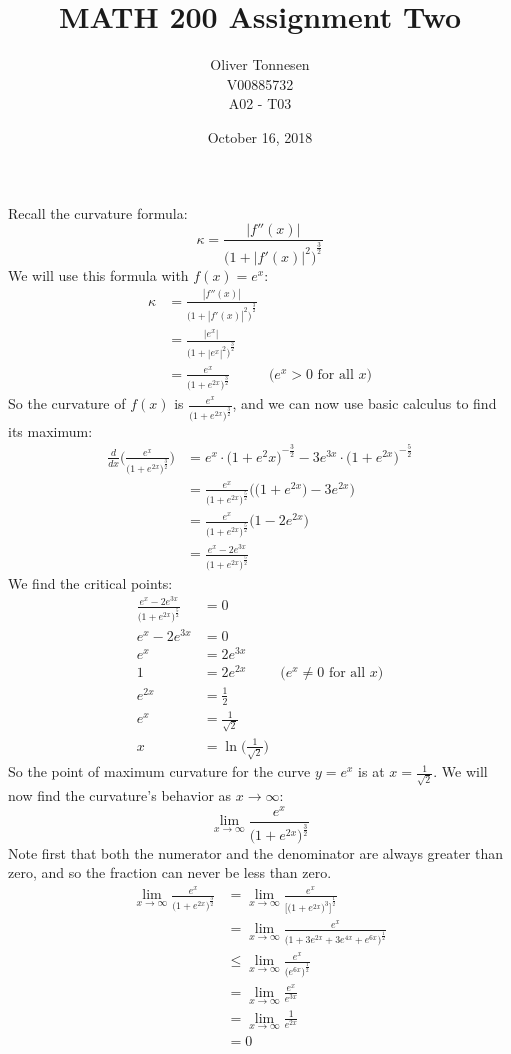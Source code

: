 \documentclass{article}
\title{MATH 200 Assignment Two}
\author{%
	Oliver Tonnesen\\
	V00885732\\
	A02 \-- T03}
\date{October 16, 2018}
\begin{document}
\maketitle
\section{} %
	Recall the curvature formula:
	\[\kappa=\frac{|f''(x)|}{{\big(1+|f'(x)|^2\big)}^{\frac{3}{2}}}\]
	We will use this formula with $f(x)=e^x$:
	\begin{align*}
		\kappa&=\frac{|f''(x)|}{{\big(1+|f'(x)|^2\big)}^{\frac{3}{2}}}\\
		&=\frac{|e^x|}{{\big(1+|e^x|^2\big)}^\frac{3}{2}}\\
		&=\frac{e^x}{{\big(1+e^{2x}\big)}^\frac{3}{2}}&\text{($e^x>0$ for all $x$)}
	\end{align*}
	So the curvature of $f(x)$ is $\frac{e^x}{{\big(1+e^{2x}\big)}^\frac{3}{2}}$, and we can now use basic calculus to find
	its maximum:
	\begin{align*}
		\frac{d}{dx}\Bigg(\frac{e^x}{{\big(1+e^{2x}\big)}^\frac{3}{2}}\Bigg)&=e^x\cdot{\big(1+e^2x\big)}^{-\frac{3}{2}}-3e^{3x}\cdot{\big(1+e^{2x}\big)}^{-\frac{5}{2}}\\
		&=\frac{e^x}{{\big(1+e^{2x}\big)}^\frac{5}{2}}\Bigg(\big(1+e^{2x}\big)-3e^{2x}\Bigg)\\
		&=\frac{e^x}{{\big(1+e^{2x}\big)}^\frac{5}{2}}\Big(1-2e^{2x}\Big)\\
		&=\frac{e^x-2e^{3x}}{{\big(1+e^{2x}\big)}^\frac{5}{2}}
	\end{align*}
	We find the critical points:
	\begin{align*}
		\frac{e^x-2e^{3x}}{{\big(1+e^{2x}\big)}^\frac{5}{2}}&=0\\
		e^x-2e^{3x}&=0\\
		e^x&=2e^{3x}\\
		1&=2e^{2x}&\text{($e^x\neq{0}$ for all $x$)}\\
		e^{2x}&=\frac{1}{2}\\
		e^x&=\frac{1}{\sqrt{2}}\\
		x&=\ln{\bigg(\frac{1}{\sqrt{2}}\bigg)}
	\end{align*}
	So the point of maximum curvature for the curve $y=e^x$ is at $x=\frac{1}{\sqrt2}$.
	We will now find the curvature's behavior as $x\to\infty$:
	\[\lim_{x\to\infty}\frac{e^x}{{\big(1+e^{2x}\big)}^{\frac{3}{2}}}\]
	Note first that both the numerator and the denominator are always greater than zero, and so
	the fraction can never be less than zero.
	\begin{align*}
		\lim_{x\to\infty}\frac{e^x}{{\big(1+e^{2x}\big)}^{\frac{3}{2}}}&=\lim_{x\to\infty}\frac{e^x}{{\bigg[{\big(1+e^{2x}\big)}^3\bigg]}^\frac{1}{2}}\\
		&=\lim_{x\to\infty}\frac{e^x}{{\big(1+3e^{2x}+3e^{4x}+e^{6x}\big)}^{\frac{1}{2}}}\\
		&\le\lim_{x\to\infty}\frac{e^x}{{\big(e^{6x}\big)}^\frac{1}{2}}\\
		&=\lim_{x\to\infty}\frac{e^x}{e^{3x}}\\
		&=\lim_{x\to\infty}\frac{1}{e^{2x}}\\
		&=0
	\end{align*}
\end{document}
